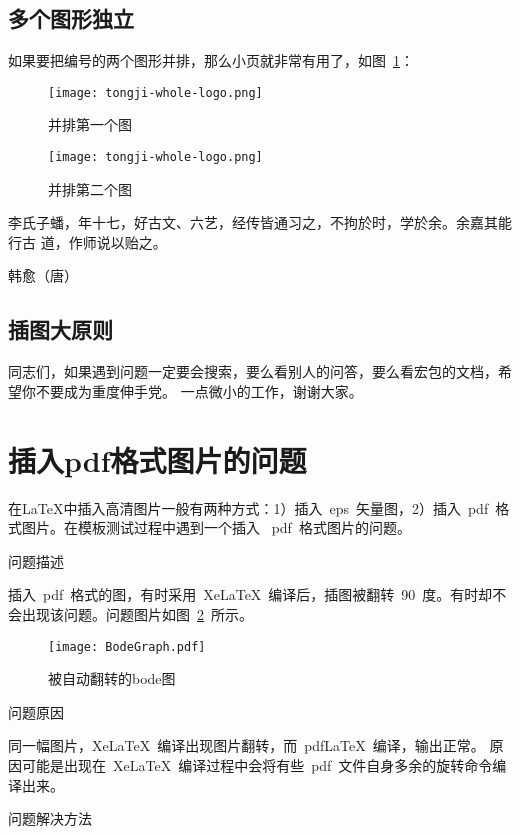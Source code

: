 \subsection{多个图形独立}
如果要把编号的两个图形并排，那么小页就非常有用了，如图~\ref{fig:parallel2}：
\begin{figure}
  \begin{minipage}{0.48\textwidth}
    \centering
    \texttt{[image: tongji-whole-logo.png]}
    \caption{并排第一个图}
    \label{fig:parallel1}
  \end{minipage}\hfill
  \begin{minipage}{0.48\textwidth}
    \centering
    \texttt{[image: tongji-whole-logo.png]}
    \caption{并排第二个图}
    \label{fig:parallel2}
  \end{minipage}
\end{figure}


李氏子蟠，年十七，好古文、六艺，经传皆通习之，不拘於时，学於余。余嘉其能行古
道，作师说以贻之。

\hfill \pozhehao 韩愈（唐）


\subsection{插图大原则}
同志们，如果遇到问题一定要会搜索，要么看别人的问答，要么看宏包的文档，希望你不要成为重度伸手党。
一点微小的工作，谢谢大家。

\section{插入pdf格式图片的问题}
\label{sec:problem}
在\LaTeX{}中插入高清图片一般有两种方式：1）插入~eps~矢量图，2）插入~pdf~格式图片。在模板测试过程中遇到一个插入
~pdf~格式图片的问题。

问题描述

插入~pdf~格式的图，有时采用~XeLaTeX~编译后，插图被翻转~90~度。有时却不会出现该问题。问题图片如图~\ref{rotatedBode}~所示。
\begin{figure}[H]
  \centering
  \texttt{[image: BodeGraph.pdf]}
  \caption{被自动翻转的bode图}
  \label{rotatedBode}
\end{figure}

问题原因

同一幅图片，XeLaTeX~编译出现图片翻转，而~pdfLaTeX~编译，输出正常。
原因可能是出现在~XeLaTeX~编译过程中会将有些~pdf~文件自身多余的旋转命令编译出来。

问题解决方法

